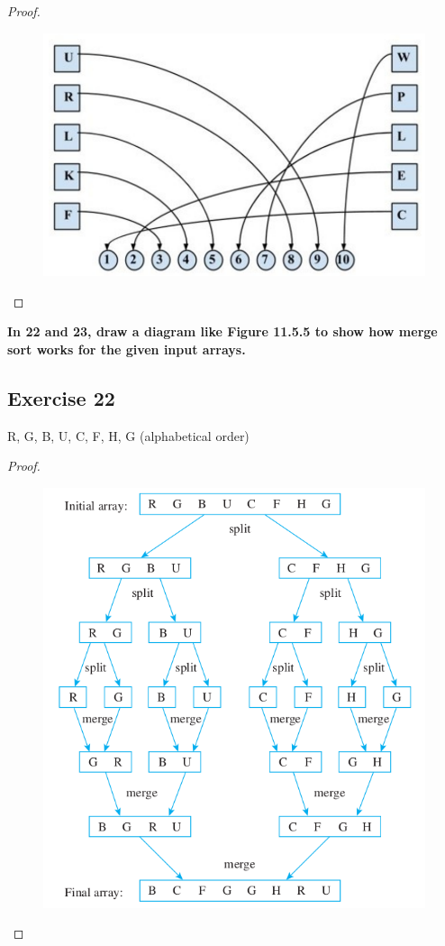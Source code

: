 \documentclass[14pt]{extarticle}
\newcommand{\cy}{\color{cyan}}
\begin{document}
\begin{proof}
    \begin{figure}[ht!]
        \centering
        \includegraphics[scale=0.3]{../images/11.5.21.png}
    \end{figure}
\end{proof}

{\bf \cy In 22 and 23, draw a diagram like Figure 11.5.5 to show how merge sort works for the given input arrays.}

\subsection{Exercise 22}
R, G, B, U, C, F, H, G (alphabetical order)

\begin{proof}
    \begin{figure}[ht!]
        \centering
        \includegraphics[scale=0.5]{../images/11.5.22.png}
    \end{figure}
\end{proof}
\end{document}
